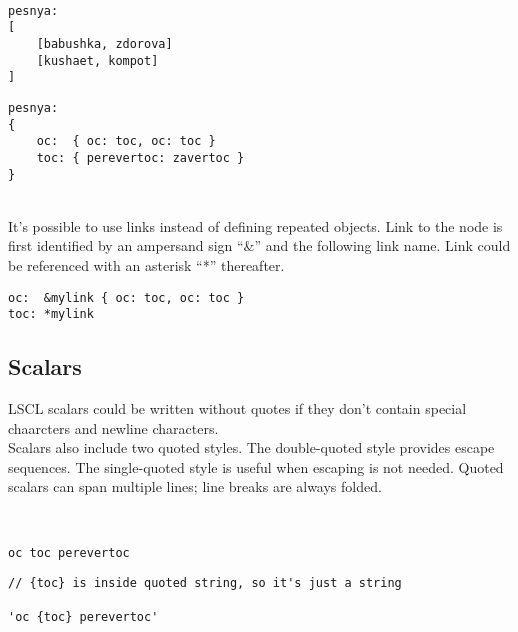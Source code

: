 ~\\
\begin{minipage}{0.45\textwidth}
\begin{lstlisting}[caption = list of lists]
pesnya:
[
	[babushka, zdorova]
	[kushaet, kompot]
]
\end{lstlisting}
\end{minipage}
\hfill
\begin{minipage}{0.45\textwidth}
\begin{lstlisting}[caption = map of maps]
pesnya:
{
	oc:  { oc: toc, oc: toc }
	toc: { perevertoc: zavertoc }
}
\end{lstlisting}
\end{minipage}
~\\
It's possible to use links instead of defining repeated objects. Link to the node is first identified by an ampersand sign ``\&'' and the following link name. Link could be referenced with an asterisk ``*'' thereafter.
\begin{lstlisting}[caption = using links]
oc:  &mylink { oc: toc, oc: toc }
toc: *mylink
\end{lstlisting}

\subsection{Scalars}
LSCL scalars could be written without quotes if they don't contain special chaarcters and newline characters. \\
Scalars also include two quoted styles. The double-quoted style provides escape sequences. The single-quoted style is useful when escaping is not needed. Quoted scalars can span multiple lines; line breaks are always folded.

~\\
\begin{minipage}{0.45\textwidth}
\begin{lstlisting}[caption = plain style]
oc toc perevertoc
\end{lstlisting}
\end{minipage}
\hfill
\begin{minipage}{0.45\textwidth}
\begin{lstlisting}[caption = single-quoted style]
// {toc} is inside quoted string, so it's just a string

'oc {toc} perevertoc'
\end{lstlisting}
\end{minipage}

